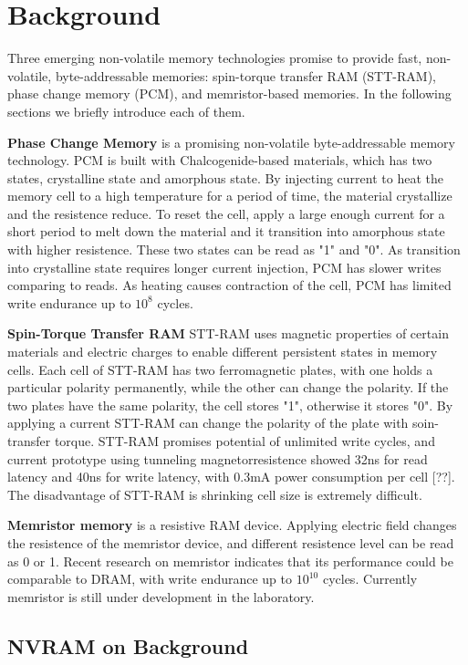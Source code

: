 \section{Background}
\label{sec:background}

Three emerging non-volatile memory technologies promise to provide fast,
 non-volatile, byte-addressable memories: spin-torque transfer RAM (STT-RAM),
phase change memory (PCM), and memristor-based memories. In the following
sections we briefly introduce each of them.

\textbf{Phase Change Memory} is a promising non-volatile byte-addressable
memory technology. PCM is built with Chalcogenide-based materials, which has
two states, crystalline state and amorphous state. By
injecting current to heat the memory cell to a high temperature for a period
of time, the material crystallize and the resistence reduce. To reset the cell,
apply a large enough current for a short period to melt down the
material and it transition into amorphous state with higher resistence.
 These two states can be read as "1" and "0". As transition into crystalline
state requires longer current injection, PCM has slower writes comparing to
reads.  
As heating causes contraction of the cell, PCM has limited write endurance
up to $10^8$ cycles.
 
\textbf{Spin-Torque Transfer RAM} STT-RAM uses magnetic properties of 
certain materials and electric charges to enable different persistent states 
in memory cells. Each cell of STT-RAM has two ferromagnetic plates, with
one holds a particular polarity permanently, while the other can change the
polarity. If the two plates have the same polarity, the cell stores "1",
otherwise it stores "0". By applying a current STT-RAM can change the polarity
of the plate with soin-transfer torque.
STT-RAM promises potential of unlimited write cycles, and
current prototype using tunneling magnetorresistence showed 32ns for
read latency and 40ns for write latency, with 0.3mA power consumption
per cell [??]. The disadvantage of STT-RAM is shrinking cell size is
extremely difficult.

\textbf{Memristor memory} is a resistive RAM device. Applying electric field
changes the resistence of the memristor device, and different resistence level
can be read as 0 or 1. Recent research on memristor indicates that its
performance could be comparable to DRAM, with write endurance up to $10^{10}$
cycles. Currently memristor is still under development in the laboratory.
 
\subsection{NVRAM on Background}
\label{sec:background}

